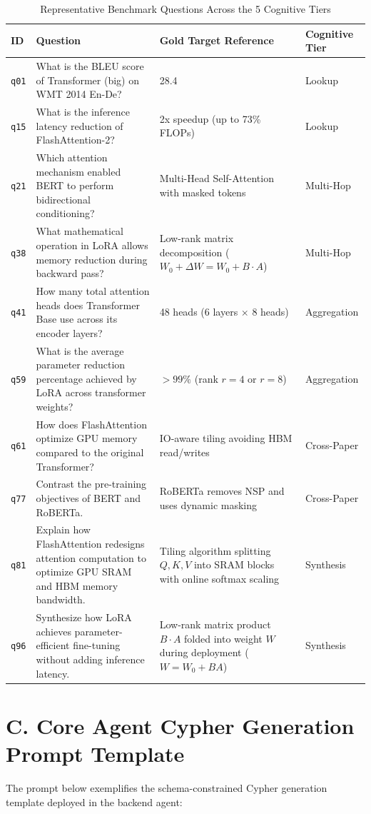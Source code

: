 \documentclass[12pt,a4paper,oneside]{report}
\begin{document}
\begin{table}[htbp]
\centering
\small
\caption{Representative Benchmark Questions Across the 5 Cognitive Tiers}
\label{tab:extended_questions}
\begin{tabularx}{\textwidth}{l p{5.5cm} p{4.5cm} X}
\toprule
\textbf{ID} & \textbf{Question} & \textbf{Gold Target Reference} & \textbf{Cognitive Tier} \\
\midrule
\texttt{q01} & What is the BLEU score of Transformer (big) on WMT 2014 En-De? & 28.4 & Lookup \\
\texttt{q15} & What is the inference latency reduction of FlashAttention-2? & 2x speedup (up to 73\% FLOPs) & Lookup \\
\texttt{q21} & Which attention mechanism enabled BERT to perform bidirectional conditioning? & Multi-Head Self-Attention with masked tokens & Multi-Hop \\
\texttt{q38} & What mathematical operation in LoRA allows memory reduction during backward pass? & Low-rank matrix decomposition ($W_0 + \Delta W = W_0 + B \cdot A$) & Multi-Hop \\
\texttt{q41} & How many total attention heads does Transformer Base use across its encoder layers? & 48 heads (6 layers $\times$ 8 heads) & Aggregation \\
\texttt{q59} & What is the average parameter reduction percentage achieved by LoRA across transformer weights? & $> 99\%$ (rank $r=4$ or $r=8$) & Aggregation \\
\texttt{q61} & How does FlashAttention optimize GPU memory compared to the original Transformer? & IO-aware tiling avoiding HBM read/writes & Cross-Paper \\
\texttt{q77} & Contrast the pre-training objectives of BERT and RoBERTa. & RoBERTa removes NSP and uses dynamic masking & Cross-Paper \\
\texttt{q81} & Explain how FlashAttention redesigns attention computation to optimize GPU SRAM and HBM memory bandwidth. & Tiling algorithm splitting $Q, K, V$ into SRAM blocks with online softmax scaling & Synthesis \\
\texttt{q96} & Synthesize how LoRA achieves parameter-efficient fine-tuning without adding inference latency. & Low-rank matrix product $B \cdot A$ folded into weight $W$ during deployment ($W = W_0 + BA$) & Synthesis \\
\bottomrule
\end{tabularx}
\end{table}

\section*{C. Core Agent Cypher Generation Prompt Template}
The prompt below exemplifies the schema-constrained Cypher generation template deployed in the backend agent:
\end{document}
